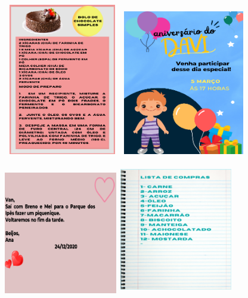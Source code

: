 \includegraphics[width=2.15625in,height=2.60417in]{media/image137.png}\includegraphics[width=2.08333in,height=2.49514in]{media/image138.png}

\includegraphics[width=2.09375in,height=2.10278in]{media/image139.png}\includegraphics[width=1.94236in,height=2.23611in]{media/image140.png}

